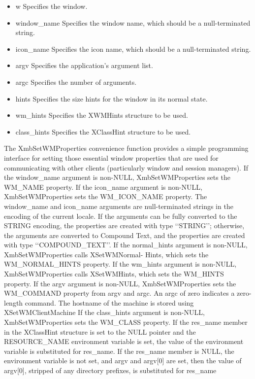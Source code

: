 \documentclass{report}
\begin{document}
\begin{itemize}
\begin{itemize}
\begin{itemize}
                \item w Specifies the window.
                \item window\_name Specifies the window name, which should be a null-terminated string.
                \item icon\_name Specifies the icon name, which should be a null-terminated string.
                \item argv Specifies the application’s argument list.
                \item argc Specifies the number of arguments.
                \item hints Specifies the size hints for the window in its normal state.
                \item wm\_hints Specifies the XWMHints structure to be used.
                \item class\_hints Specifies the XClassHint structure to be used.
            \end{itemize}
            The XmbSetWMProperties convenience function provides a simple programming interface for setting those essential window properties that are used for communicating with other clients (particularly window and session managers).
            \bigbreak \noindent 
            If the window\_name argument is non-NULL, XmbSetWMProperties sets the WM\_NAME property. If the icon\_name argument is non-NULL, XmbSetWMProperties sets the WM\_ICON\_NAME property. The window\_name and icon\_name arguments are null-terminated strings in the encoding of the current locale. If the arguments can be fully converted to the STRING encoding, the properties are created with type ‘‘STRING’’; otherwise, the arguments are converted to Compound Text, and the properties are created with type ‘‘COMPOUND\_TEXT’’.
            \bigbreak \noindent 
            If the normal\_hints argument is non-NULL, XmbSetWMProperties calls XSetWMNormal- Hints, which sets the WM\_NORMAL\_HINTS property. If the wm\_hints argument is non-NULL, XmbSetWMProperties calls XSetWMHints, which sets the WM\_HINTS property.
            \bigbreak \noindent 
            If the argv argument is non-NULL, XmbSetWMProperties sets the WM\_COMMAND property from argv and argc. An argc of zero indicates a zero-length command.
            \bigbreak \noindent 
            The hostname of the machine is stored using XSetWMClientMachine
            \bigbreak \noindent 
            If the class\_hints argument is non-NULL, XmbSetWMProperties sets the WM\_CLASS property. If the res\_name member in the XClassHint structure is set to the NULL pointer and the RESOURCE\_NAME environment variable is set, the value of the environment variable is substituted for res\_name. If the res\_name member is NULL, the environment variable is not set, and argv and argv[0] are set, then the value of argv[0], stripped of any directory prefixes, is substituted for res\_name

\end{itemize}
\end{itemize}
\end{document}
